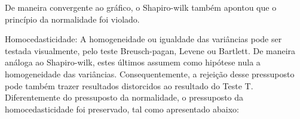 \documentclass[
]{book}
\newenvironment{Shaded}{\begin{snugshade}}{\end{snugshade}}
\newcommand{\DataTypeTok}[1]{\textcolor[rgb]{0.13,0.29,0.53}{#1}}
\newcommand{\DecValTok}[1]{\textcolor[rgb]{0.00,0.00,0.81}{#1}}
\newcommand{\KeywordTok}[1]{\textcolor[rgb]{0.13,0.29,0.53}{\textbf{#1}}}
\newcommand{\NormalTok}[1]{#1}
\newcommand{\OperatorTok}[1]{\textcolor[rgb]{0.81,0.36,0.00}{\textbf{#1}}}
\newcommand{\StringTok}[1]{\textcolor[rgb]{0.31,0.60,0.02}{#1}}
\begin{document}
De maneira convergente ao gráfico, o Shapiro-wilk também apontou que o princípio da normalidade foi violado.

Homocedasticidade: A homogeneidade ou igualdade das variâncias pode ser testada visualmente, pelo teste Breusch-pagan, Levene ou Bartlett. De maneira análoga ao Shapiro-wilk, estes últimos assumem como hipótese nula a homogeneidade das variâncias. Consequentemente, a rejeição desse pressuposto pode também trazer resultados distorcidos ao resultado do Teste T. Diferentemente do pressuposto da normalidade, o pressuposto da homocedasticidade foi preservado, tal como apresentado abaixo:

\begin{Shaded}
\end{Shaded}
\end{document}
